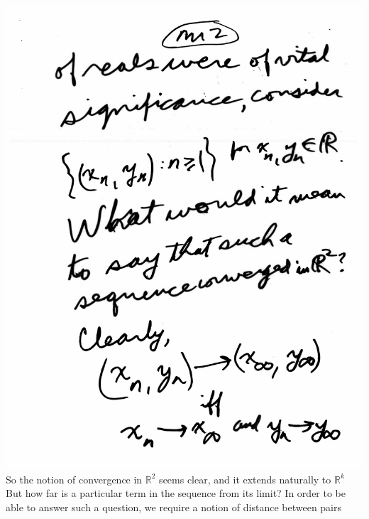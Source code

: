 \documentclass[10pt,a4paper]{article}
\begin{document}
{{\\\includegraphics[scale=0.5]{Pages/MetricSpace1_2.pdf}
\pagebreak
\\So the notion of convergence in $\mathbb{R} ^{2}$ seems clear, and it extends naturally to $\mathbb{R} ^{k}$
\\But how far is a particular term in the sequence from its limit? In order to be able to answer such a question, we require a notion of distance between pairs
}}
\end{document}
